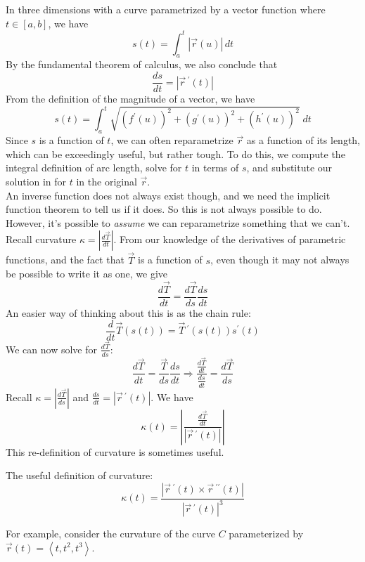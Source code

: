 In three dimensions with a curve parametrized by a vector function where \(t\in[a,b]\), we have
\[
    s(t)=\int_a^t \left\vert \vec{r}(u) \right\vert \,dt
\]
By the fundamental theorem of calculus, we also conclude that
\[
    \frac{ds}{dt}=\left\vert \vec{r}\,^{\prime} (t) \right\vert 
\]
From the definition of the magnitude of a vector, we have
\[
    s(t)=\int_a^t \sqrt{(f^{\prime} (u))^2+(g^{\prime} (u))^2 +(h^{\prime} (u))^2} \;dt
\]
Since \(s\) is a function of \(t\), we can often reparametrize \(\vec{r}\) as a function of its length, which can be exceedingly useful, but rather tough. To do this, we compute the integral definition of arc length, solve for \(t\) in terms of \(s\), and substitute our solution in for \(t\) in the original \(\vec{r}\).\\
An inverse function does not always exist though, and we need the implicit function theorem to tell us if it does. So this is not always possible to do. However, it's possible to \emph{assume} we can reparametrize something that we can't.
Recall curvature \(\kappa =\left\vert \frac{d\vec{T}}{dt} \right\vert \). From our knowledge of the derivatives of parametric functions, and the fact that \(\vec{T}\) is a function of \(s\), even though it may not always be possible to write it as one, we give
\[
    \frac{d\vec{T}}{dt}=\frac{d\vec{T}}{ds}\frac{ds}{dt}
\] 
An easier way of thinking about this is as the chain rule:
\[
    \frac{d}{dt}\vec{T}(s(t))=\vec{T}\,^{\prime} (s(t))s^{\prime} (t)
\]
We can now solve for \(\frac{d\vec{T}}{ds}\):
\[
    \frac{d\vec{T}}{dt}=\frac{\vec{T}}{ds}\frac{ds}{dt}\Longrightarrow \frac{\frac{d\vec{T}}{dt}}{\frac{ds}{dt}}=\frac{d\vec{T}}{ds}
\]
Recall \(\kappa =\left\vert \frac{d\vec{T}}{ds} \right\vert \) and \(\frac{ds}{dt}=\left|\vec{r}\,^{\prime} (t)\right|\). We have
\[
    \kappa (t)=\left\vert \frac{\frac{d\vec{T}}{dt}}{\left\vert \vec{r}\,^{\prime} (t) \right\vert } \right\vert 
\]
This re-definition of curvature is sometimes useful.
\begin{definition}
    The useful definition of curvature:
    \[
        \kappa (t)=\frac{\left\vert \vec{r}\,^{\prime} (t)\times \vec{r}\,^{\prime\prime} (t) \right\vert }{\left\vert \vec{r}\,^{\prime} (t) \right\vert^3 }
    \]    
\end{definition}
For example, consider the curvature of the curve \(C\) parameterized by \(\vec{r}(t)=\left\langle t,t^2 ,t^3\right\rangle \).
